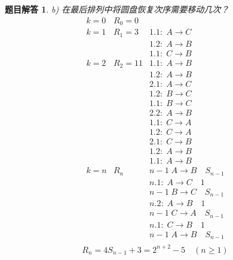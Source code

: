 \documentclass[mode=geye]{elegantnote}
\newtheorem{answer}{题目解答}
\begin{document}
\begin{answer}
	b) 在最后排列中将圆盘恢复次序需要移动几次？
	\begin{equation*}
		\begin{array}{lll}
			k=0	& R_0=0		&	\\
			k=1	& R_1=3		& 1.1:\; A \rightarrow C\\
				&			& 1.2:\; A \rightarrow B\\
				&			& 1.1:\; C \rightarrow B\\
			k=2	& R_2=11	& 1.1:\; A \rightarrow B\\
				&			& 1.2:\; A \rightarrow B\\
				&			& 2.1:\; A \rightarrow C\\
				&			& 1.2:\; B \rightarrow C\\
				&			& 1.1:\; B \rightarrow C\\
				&			& 2.2:\; A \rightarrow B\\
				&			& 1.1:\; C \rightarrow A\\
				&			& 1.2:\; C \rightarrow A\\
				&			& 2.1:\; C \rightarrow B\\
				&			& 1.2:\; A \rightarrow B\\
				&			& 1.1:\; A \rightarrow B\\
			k=n	& R_n 		& n-1\;  			A \rightarrow B\quad S_{n-1}\\
				&			& n.1:\; 			A \rightarrow C\quad 1		\\	
				&			& n-1\; 			B \rightarrow C\quad S_{n-1}\\	
				&			& n.2:\; 			A \rightarrow B\quad 1		\\	
				&			& n-1\; 			C \rightarrow A\quad S_{n-1}\\	
				&			& n.1:\; 			C \rightarrow B\quad 1		\\
				&			& n-1\;  			A \rightarrow B\quad S_{n-1}\\
		\end{array}
	\end{equation*}
\begin{equation*}
	R_n = 4S_{n-1}+3 = 2^{n+2}-5 \quad(n\geqslant 1)
\end{equation*}
\end{answer}
\end{document}
